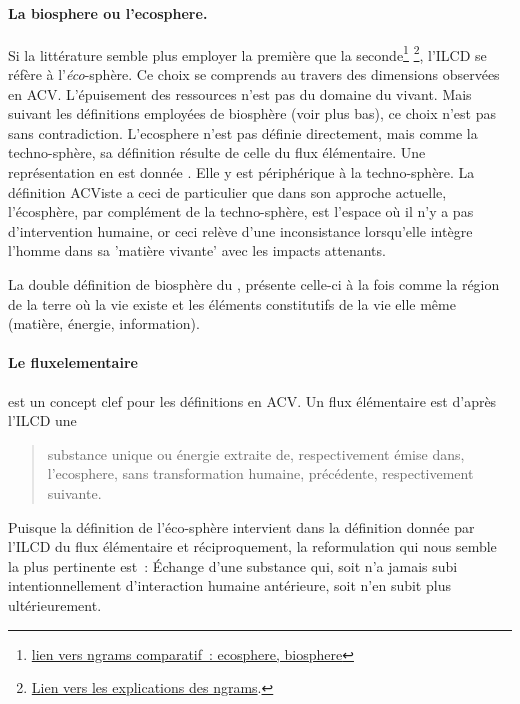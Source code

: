 \paragraph{La \gls{biosphere} ou l'\gls{ecosphere}.}
Si la littérature semble plus employer la première que la seconde\footnote{\href{https://books.google.com/ngrams/graph?content=biosphere,ecosphere&year_start=1800&year_end=2008}{lien vers ngrams comparatif~: ecosphere, biosphere}} \footnote{\href{https://books.google.com/ngrams/info}{Lien vers les explications des ngrams}.}, l'ILCD se réfère à l'\emph{éco}-sphère.
Ce choix se comprends au travers des dimensions observées en ACV.
L'épuisement des ressources n'est pas du domaine du vivant.
Mais suivant les définitions employées de biosphère (voir plus bas), ce choix n'est pas sans contradiction.
L'\gls{ecosphere} n'est pas définie directement, mais comme la techno-sphère, sa définition résulte de celle du flux élémentaire.
Une représentation en est donnée \cite[figure 13 p.99]{european_commission_ilcd_2010}.
Elle y est périphérique à la techno-sphère.
La définition ACViste a ceci de particulier que dans son approche actuelle, l'écosphère, par complément de la techno-sphère, est l'espace où il n'y a pas d'intervention humaine, or ceci relève d'une inconsistance lorsqu'elle intègre l'homme dans sa 'matière vivante' avec les impacts attenants.

La double définition de biosphère du , présente celle-ci à la fois comme la région de la terre où la vie existe et les éléments constitutifs de la vie elle même (matière, énergie, information).

\paragraph{Le \gls{fluxelementaire}} est un concept clef pour les définitions en ACV. Un flux élémentaire est d'après l'ILCD une \blockcquote[traduction et synthèse d'un extrait de "Terms and concepts" p.94]{european_commission_ilcd_2010}{substance unique ou énergie extraite de, respectivement émise dans, l'\gls{ecosphere}, sans transformation humaine, précédente, respectivement suivante.}
Puisque la définition de l'éco-sphère intervient dans la définition donnée par l'ILCD du flux élémentaire et réciproquement, la reformulation qui nous semble la plus pertinente est~:
Échange d'une substance qui, soit n'a jamais subi intentionnellement d’interaction humaine antérieure, soit n'en subit plus ultérieurement.


